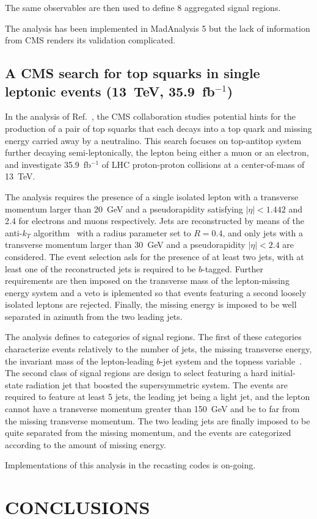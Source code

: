 \documentclass[11pt]{cernrep}
\begin{document}
The same observables are then used to define 8 aggregated signal regions.

The analysis has been implemented in MadAnalysis 5 but the lack of
information from CMS renders its validation complicated.


\subsection{A CMS search for top squarks in single leptonic events (13~TeV,
  35.9~fb$^{-1}$)}

In the analysis of Ref.~\cite{Sirunyan:2017xse}, the CMS collaboration studies
potential hints for the production of a pair of top squarks that each decays
into a top quark and missing energy carried away by a neutralino. This search
focuses on top-antitop system further decaying semi-leptonically, the lepton
being either a muon or an electron, and investigate 35.9~fb$^{-1}$ of LHC
proton-proton collisions at a center-of-mass of 13~TeV.

The analysis requires the presence of a single isolated lepton with a transverse
momentum larger than 20~GeV and a pseudorapidity satisfying $|\eta| < 1.442$ and
2.4 for electrons and muons respectively. Jets are reconstructed by means of the
anti-$k_T$ algorithm~\cite{Cacciari:2008gp} with a radius parameter set to
$R=0.4$, and only jets with a transverse momentum larger than 30~GeV and a
pseudorapidity $|\eta| < 2.4$ are considered. The event selection asls for the
presence of at least two jets, with at least one of the reconstructed
jets is required to be $b$-tagged. Further requirements are then imposed on the
transverse mass of the lepton-missing energy system and a veto is iplemented so
that events featuring a second loosely isolated leptons are rejected. Finally,
the missing energy is imposed to be well separated in azimuth from the two
leading jets.

The analysis defines to categories of signal regions. The first of these
categories characterize events relatively to the number of jets, the missing
transverse energy, the invariant mass of the lepton-leading $b$-jet system and
the topness variable~\cite{Graesser:2012qy}. The second class of signal regions are
design to select featuring a hard initial-state radiation jet that boosted the
supersymmetric system. The events are required to feature at least 5 jets, the
leading jet being a light jet, and the lepton cannot have a transverse momentum
greater than 150~GeV and be to far from the missing transverse momentum. The
two leading jets are finally imposed to be quite separated from the missing
momentum, and the events are categorized according to the amount of missing
energy.

Implementations of this analysis in the recasting codes is on-going. 



\section*{CONCLUSIONS}



\end{document}
